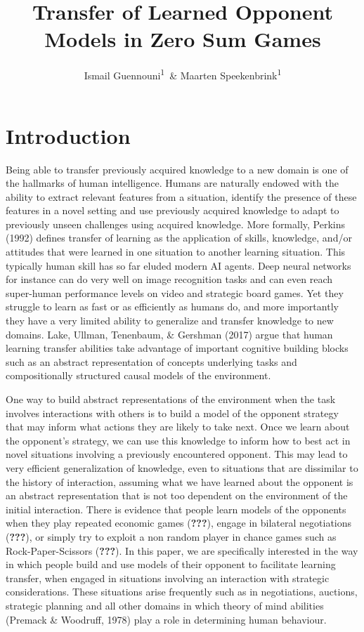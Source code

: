 \documentclass[man,floatsintext]{apa6}
\affiliation{
\vspace{0.5cm}
\textsuperscript{1} Department of Experimental Psychology, University College London}
\title{Transfer of Learned Opponent Models in Zero Sum Games}
\author{Ismail Guennouni\textsuperscript{1}~\& Maarten Speekenbrink\textsuperscript{1}}
\date{}
\begin{document}
\maketitle

\hypertarget{introduction}{%
\section{Introduction}\label{introduction}}

Being able to transfer previously acquired knowledge to a new domain is one of the hallmarks of human intelligence. Humans are naturally endowed with the ability to extract relevant features from a situation, identify the presence of these features in a novel setting and use previously acquired knowledge to adapt to previously unseen challenges using acquired knowledge. More formally, Perkins (1992) defines transfer of learning as the application of skills, knowledge, and/or attitudes that were learned in one situation to another learning situation. This typically human skill has so far eluded modern AI agents. Deep neural networks for instance can do very well on image recognition tasks and can even reach super-human performance levels on video and strategic board games. Yet they struggle to learn as fast or as efficiently as humans do, and more importantly they have a very limited ability to generalize and transfer knowledge to new domains. Lake, Ullman, Tenenbaum, \& Gershman (2017) argue that human learning transfer abilities take advantage of important cognitive building blocks such as an abstract representation of concepts underlying tasks and compositionally structured causal models of the environment.

One way to build abstract representations of the environment when the task involves interactions with others is to build a model of the opponent strategy that may inform what actions they are likely to take next. Once we learn about the opponent's strategy, we can use this knowledge to inform how to best act in novel situations involving a previously encountered opponent. This may lead to very efficient generalization of knowledge, even to situations that are dissimilar to the history of interaction, assuming what we have learned about the opponent is an abstract representation that is not too dependent on the environment of the initial interaction. There is evidence that people learn models of the opponents when they play repeated economic games ({\textbf{???}}), engage in bilateral negotiations ({\textbf{???}}), or simply try to exploit a non random player in chance games such as Rock-Paper-Scissors ({\textbf{???}}). In this paper, we are specifically interested in the way in which people build and use models of their opponent to facilitate learning transfer, when engaged in situations involving an interaction with strategic considerations. These situations arise frequently such as in negotiations, auctions, strategic planning and all other domains in which theory of mind abilities (Premack \& Woodruff, 1978) play a role in determining human behaviour.
\end{document}
